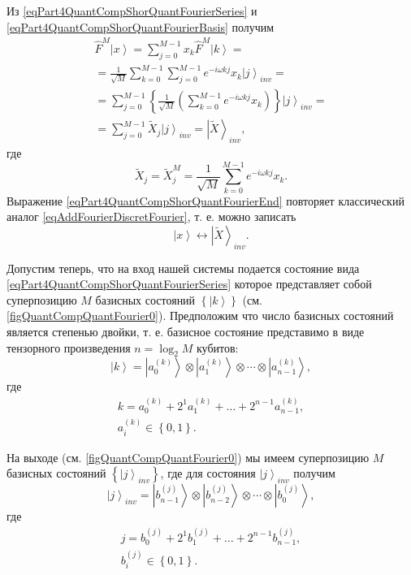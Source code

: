 Из \eqref{eqPart4QuantCompShorQuantFourierSeries} и
\eqref{eqPart4QuantCompShorQuantFourierBasis} получим
\begin{eqnarray}
\hat{F}^{M}\left|x\right> = \sum_{j = 0}^{M - 1}x_k \hat{F}^{M}
\left|k\right> = 
\nonumber \\
= \frac{1}{\sqrt{M}}\sum_{k = 0}^{M -1}\sum_{j = 0}^{M - 1}
e^{-i \omega k j}x_k\left|j\right>_{inv} = 
\nonumber \\
= \sum_{j = 0}^{M - 1} \left\{\frac{1}{\sqrt{M}}\left(
\sum_{k = 0}^{M - 1}e^{-i \omega k j} x_k
\right)\right\}\left|j\right>_{inv} = 
\nonumber \\
= \sum_{j = 0}^{M - 1}\tilde{X}_j\left|j\right>_{inv} = \left|\tilde{X}\right>_{inv},
\nonumber
\end{eqnarray}
где 
\begin{equation}
\tilde{X}_j = \tilde{X}_j^{M} = 
\frac{1}{\sqrt{M}}\sum_{k = 0}^{M - 1}e^{-i \omega k j} x_k.
\label{eqPart4QuantCompShorQuantFourierEnd}
\end{equation}
Выражение \eqref{eqPart4QuantCompShorQuantFourierEnd} повторяет
классический аналог \eqref{eqAddFourierDiscretFourier}, т. е. можно записать
\[
 \left|x\right> \longleftrightarrow \left|\tilde{X}\right>_{inv}.
\]



Допустим теперь, что на вход нашей системы подается состояние вида
\eqref{eqPart4QuantCompShorQuantFourierSeries} которое представляет
собой суперпозицию $M$ базисных состояний
$\left\{\left|k\right>\right\}$ 
(см. \autoref{figQuantCompQuantFourier0}). 
Предположим что число базисных
состояний является степенью двойки, т. е. базисное состояние
представимо в виде тензорного произведения $n = \log_2{M}$ кубитов:
\begin{equation}
\left|k\right> = \left|a^{(k)}_0\right> \otimes  \left|a^{(k)}_1\right>
\otimes \cdots \otimes \left|a^{(k)}_{n-1}\right>, 
\nonumber
\end{equation}
где
\begin{eqnarray}
k = a^{(k)}_0 + 2^1 a^{(k)}_1 + \dots + 2^{n-1} a^{(k)}_{n-1},
\nonumber \\
a^{(k)}_i \in \left\{0, 1\right\}.
\nonumber
\end{eqnarray}

На выходе
(см. \autoref{figQuantCompQuantFourier0})
мы имеем суперпозицию $M$ базисных состояний
$\left\{\left|j\right>_{inv}\right\}$, где для состояния
$\left|j\right>_{inv}$ получим 
\begin{equation}
\left|j\right>_{inv} = \left|b^{(j)}_{n-1}\right> \otimes
\left|b^{(j)}_{n-2}\right> 
\otimes \cdots \otimes \left|b^{(j)}_{0}\right>, 
\nonumber
\end{equation}
где
\begin{eqnarray}
j = b^{(j)}_0 + 2^1 b^{(j)}_1 + \dots + 2^{n-1} b^{(j)}_{n-1},
\nonumber \\
b^{(j)}_i \in \left\{0, 1\right\}.
\nonumber
\end{eqnarray}


